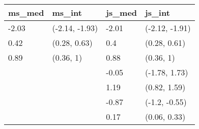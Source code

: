 
\begin{tabular}{llll}
\toprule
ms\_med & ms\_int & js\_med & js\_int\\
\midrule
-2.03 & (-2.14, -1.93) & -2.01 & (-2.12, -1.91)\\
0.42 & (0.28, 0.63) & 0.4 & (0.28, 0.61)\\
0.89 & (0.36, 1) & 0.88 & (0.36, 1)\\
 &  & -0.05 & (-1.78, 1.73)\\
 &  & 1.19 & (0.82, 1.59)\\
 &  & -0.87 & (-1.2, -0.55)\\
 &  & 0.17 & (0.06, 0.33)\\
\bottomrule
\end{tabular}
